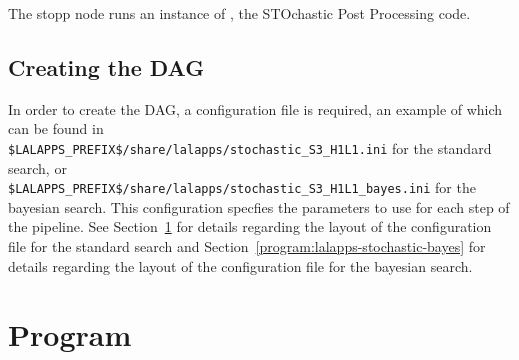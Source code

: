 The stopp node runs an instance of , the STOchastic
Post Processing code.

\subsection{Creating the DAG}

In order to create the DAG, a configuration file is required, an example
of which can be found in\\
\texttt{\$LALAPPS\_PREFIX\$/share/lalapps/stochastic\_S3\_H1L1.ini} for
the standard search, or\\
\texttt{\$LALAPPS\_PREFIX\$/share/lalapps/stochastic\_S3\_H1L1\_bayes.ini}
for the bayesian search. This configuration specfies the parameters to
use for each step of the pipeline. See
Section~\ref{program:lalapps-stochastic-pipe} for details regarding the
layout of the configuration file for the standard search and
Section~\ref{program:lalapps-stochastic-bayes} for details regarding the
layout of the configuration file for the bayesian search.

\clearpage
\section{Program }
\label{program:lalapps-stochastic-pipe}

